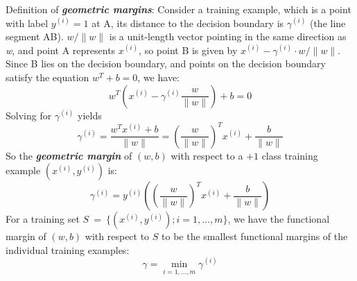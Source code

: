 \documentclass{article}
\begin{document}
Definition of \emph{\textbf{geometric margins}}:
Consider a training example, which is a point with label $y^{(i)}=1$ at A, its distance to the decision boundary is $\gamma^{(i)}$ (the line segment AB). $w/\lVert w \rVert$ is a unit-length vector pointing in the same direction as \emph{w}, and point A represents $x^{(i)}$, so point B is given by $x^{(i)}-\gamma^{(i)}\cdot w/\lVert w \rVert$. Since B lies on the decision boundary, and points on the decision boundary satisfy the equation $w^T+b=0$, we have:
\begin{equation*}
w^T\left(x^{(i)}-\gamma^{(i)}\frac{w}{\lVert w \rVert}\right) + b =0
\end{equation*}
Solving for $\gamma^{(i)}$ yields
\begin{equation*}
\gamma^{(i)}=\frac{w^Tx^{(i)}+b}{\lVert w\rVert}={\left(\frac{w}{\lVert w\rVert}\right)}^Tx^{(i)}+\frac{b}{\lVert w\rVert}
\end{equation*}
So the \emph{\textbf{geometric margin}} of $(w,b)$ with respect to a $+1$ class training example $(x^{(i)},y^{(i)})$ is:
\begin{equation*}
\gamma^{(i)}=y^{(i)}\left(\left(\frac{w}{\lVert w\rVert}\right)^T x^{(i)}+\frac{b}{\lVert w\rVert}\right)
\end{equation*}
For a training set $S\ =\ \{(x^{(i)},y^{(i)});i=1,\ldots,m\}$, we have the functional margin of $(w,b)$ with respect to $S$ to be the smallest functional margins of the individual training examples:
\begin{equation*}
\gamma=\min_{i=1,\ldots,m}\gamma^{(i)}
\end{equation*}
\end{document}
